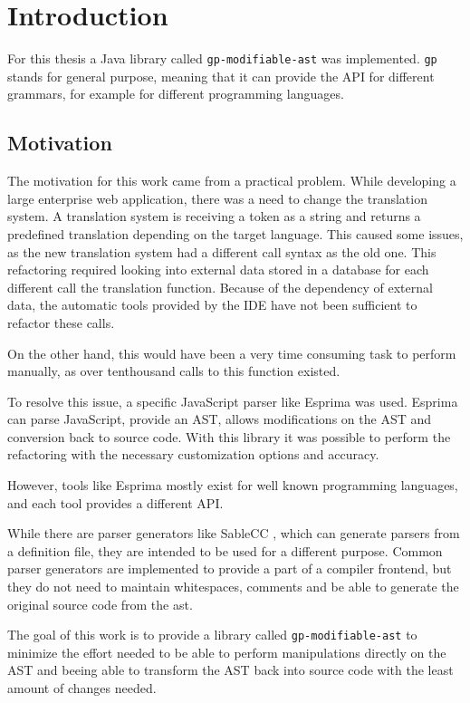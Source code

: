 \section{Introduction}

For this thesis a Java library called \verb|gp-modifiable-ast| was implemented. 
\verb|gp| stands for general purpose, meaning that it can provide the API for different grammars, for example for different programming languages.

\subsection{Motivation}

The motivation for this work came from a practical problem. 
While developing a large enterprise web application, there was a need to change the translation system.
A translation system is receiving a token as a string and returns a predefined translation depending on the target language.
This caused some issues, as the new translation system had a different call syntax as the old one.
This refactoring required looking into external data stored in a database for each different call the translation function.
Because of the dependency of external data, the automatic tools provided by the IDE have not been sufficient to refactor these calls.

On the other hand, this would have been a very time consuming task to perform manually, as over tenthousand calls to this function existed.

To resolve this issue, a specific JavaScript parser like Esprima \cite{esprima} was used. 
Esprima can parse JavaScript, provide an AST, allows modifications on the AST and conversion back to source code.
With this library it was possible to perform the refactoring with the necessary customization options and accuracy.

However, tools like Esprima mostly exist for well known programming languages, and each tool provides a different API.

While there are parser generators like SableCC \cite{sablecc}, which can generate parsers from a definition file, they are intended to be used for a different
purpose.
Common parser generators are implemented to provide a part of a compiler frontend, but they do not need to maintain whitespaces,
comments and be able to generate the original source code from the ast.

The goal of this work is to provide a library called \verb|gp-modifiable-ast| to minimize the effort needed to be able to perform manipulations directly on the AST and
beeing able to transform the AST back into source code with the least amount of changes needed.

